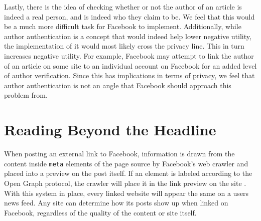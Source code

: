 \documentclass[12pt]{article}
\begin{document}
Lastly, there is the idea of checking whether or not the author of an article is indeed a real person, and is indeed who they claim to be. We feel that this would be a much more difficult task for Facebook to implement. Additionally, while author authentication is a concept that would indeed help lower negative utility, the implementation of it would most likely cross the privacy line. This in turn increases negative utility. For example, Facebook may attempt to link the author of an article on some site to an individual account on Facebook for an added level of author verification. Since this has implications in terms of privacy, we feel that author authentication is not an angle that Facebook should approach this problem from.

\section{Reading Beyond the Headline}

When posting an external link to Facebook, information is drawn from the content inside \texttt{meta} elements of the page source by Facebook's web crawler and placed into a preview on the post itself. If an element is labeled according to the Open Graph protocol, the crawler will place it in the link preview on the site \citep{fbwebmaster}. With this system in place, every linked website will appear the same on a users news feed. Any site can determine how its posts show up when linked on Facebook, regardless of the quality of the content or site itself. \\
\end{document}
